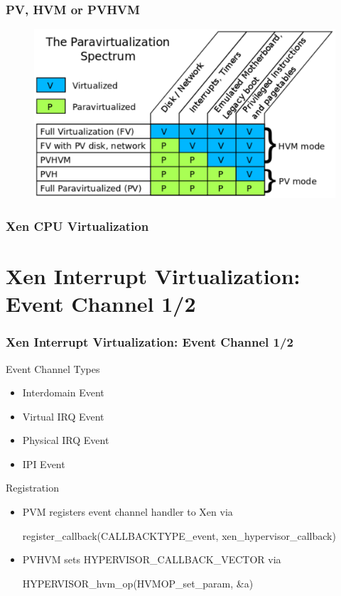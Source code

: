\documentclass[aspectratio=169]{beamer}
\begin{document}

\begin{frame}
\frametitle{PV, HVM or PVHVM}
\begin{figure}
\includegraphics[width=0.8\linewidth]{figures/spectrum.pdf}
\end{figure}
\end{frame}


\begin{frame}
\frametitle{Xen CPU Virtualization}
\end{frame}


\section{Xen Interrupt Virtualization: Event Channel 1/2}
\begin{frame}
\frametitle{Xen Interrupt Virtualization: Event Channel 1/2}
\begin{block}{Event Channel Types}
\begin{itemize}
\item Interdomain Event
\item Virtual IRQ Event
\item Physical IRQ Event
\item IPI Event
\end{itemize}
\end{block}
\begin{block}{Registration}
\begin{itemize}
\item PVM registers event channel handler to Xen via 

register\_callback(CALLBACKTYPE\_event, xen\_hypervisor\_callback)

\item PVHVM sets HYPERVISOR\_CALLBACK\_VECTOR via

HYPERVISOR\_hvm\_op(HVMOP\_set\_param, \&a)
\end{itemize}
\end{block}

\end{frame}
\end{document}
